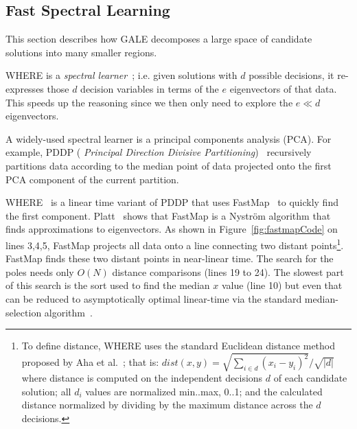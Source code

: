 \documentclass[10pt,journal,compsoc]{IEEEtran}
\newcommand{\fig}[1]{Figure~\ref{fig:#1}}
\begin{document}
 


\subsection{Fast Spectral Learning}\label{sec:spectral}
This section describes how GALE
decomposes a large space of candidate solutions into many smaller
regions.

WHERE is a {\em spectral learner}~\cite{KamvarKM03}; i.e. given solutions with $d$ possible decisions,
it
re-expresses those $d$ decision variables in terms of the
$e$ eigenvectors of that data.
This speeds up the reasoning since we then only need to
explore the $e\ll d$   eigenvectors.

A widely-used spectral learner is a principal
 components analysis (PCA).  For example, PDDP ({\em
 Principal Direction Divisive
 Partitioning})~\cite{boley98} recursively
 partitions data according to the median point of
 data projected onto the first PCA component of the
 current partition.

WHERE~\cite{me12d} is a linear time variant of PDDP  that uses FastMap~\cite{Faloutsos1995}
to quickly find the first component.
Platt~\cite{platt05} shows that FastMap is a  Nystr\"om 
algorithm that finds approximations to eigenvectors.
As shown in \fig{fastmapCode} on lines 3,4,5, FastMap  projects all data onto a line
connecting two distant points\footnote{
To define distance, WHERE uses 
the standard Euclidean distance method proposed by 
Aha et al.~\cite{aha91}; that is:
$dist(x,y)= \sqrt{\sum_{i\in d} (x_i - y_i)^2}/\sqrt{ 
\left\vert{d}\right\vert }$ where distance is
computed on the independent decisions $d$ of each candidate solution;
all $d_i$ values are normalized min..max, 0..1; and the calculated distance normalized by dividing by the maximum distance
across the $d$ decisions.}. 
FastMap finds these two distant points in near-linear
time. The search for the poles needs only
$O(N)$ distance comparisons (lines 19 to 24).
The slowest part of this search is the sort used to find the median $x$ value 
(line 10) but even that
can be reduced to  asymptotically optimal linear-time
via the standard median-selection algorithm~\cite{hoare61}.
\end{document}
